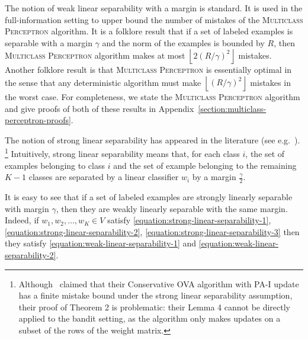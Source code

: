 The notion of weak linear separability with a margin is standard. It is used in the
full-information setting to upper bound the number of mistakes of the
\textsc{Multiclass Perceptron} algorithm. It is a
folklore result that if a set of labeled examples is separable with a margin
$\gamma$ and the norm of the examples is bounded by $R$, then \textsc{Multiclass
Perceptron} algorithm makes at most $\left\lfloor 2(R/\gamma)^2 \right \rfloor$
mistakes. Another folklore result is that \textsc{Multiclass Perceptron} is
essentially optimal in the sense that any deterministic algorithm must make
$\left\lfloor (R/\gamma)^2 \right \rfloor$ mistakes in the worst case. For
completeness, we state the \textsc{Multiclass Perceptron} algorithm
and give proofs of both of these results in
Appendix~\ref{section:multiclass-perceptron-proofs}.

The notion of strong linear separability has appeared in the literature
(see e.g.~\cite{Chen-Chen-Zhang-Chen-Zhang-2009}).
\footnote{Although~\cite{Chen-Chen-Zhang-Chen-Zhang-2009} claimed that their
Conservative OVA algorithm with PA-I update has a finite mistake bound under the strong
linear separability assumption, their proof of Theorem 2 is problematic: their
Lemma 4 cannot be directly applied to the bandit setting,
as the algorithm only makes updates on a subset of the rows of the weight matrix.}
Intuitively, strong linear
separability means that, for each class $i$, the set of examples belonging to class $i$ and
the set of example belonging to the remaining $K-1$ classes are separated by
a linear classifier $w_i$ by a margin $\frac \gamma 2$.


It is easy to see that if a set of labeled examples are strongly linearly
separable with margin $\gamma$, then they are weakly linearly separable with
the same margin. Indeed, if $w_1, w_2, \dots, w_K \in V$
satisfy \eqref{equation:strong-linear-separability-1},
\eqref{equation:strong-linear-separability-2},
\eqref{equation:strong-linear-separability-3} then they satisfy
\eqref{equation:weak-linear-separability-1} and
\eqref{equation:weak-linear-separability-2}.

